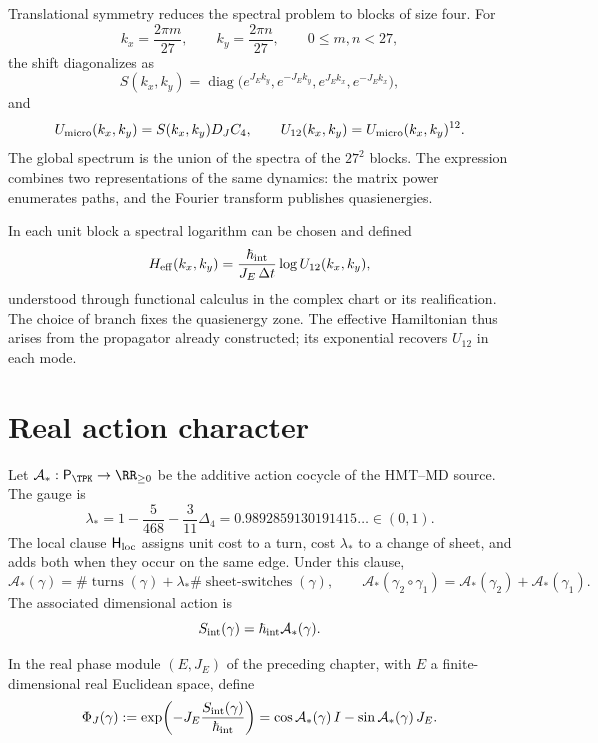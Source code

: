 Translational symmetry reduces the spectral problem to blocks of size
four. For
\[
 k_x=\frac{2\pi m}{27},\qquad
 k_y=\frac{2\pi n}{27},
 \qquad 0\le m,n<27,
\]
the shift diagonalizes as
\[
 S(k_x,k_y)=\operatorname{diag}
 \bigl(e^{J_Ek_y},e^{-J_Ek_y},e^{J_Ek_x},e^{-J_Ek_x}\bigr),
\]
and
\begin{equation}
 U_{\rm micro}(k_x,k_y)=S(k_x,k_y)D_JC_4,
 \qquad
 U_{12}(k_x,k_y)=U_{\rm micro}(k_x,k_y)^{12}.
 \label{eq:bloque-fourier-ledger-27}
\end{equation}
The global spectrum is the union of the spectra of the \(27^2\) blocks.
The expression combines two representations of the same dynamics: the matrix
power enumerates paths, and the Fourier transform publishes
quasienergies.

In each unit block a spectral logarithm can be chosen and defined
\[
 H_{\rm eff}(k_x,k_y)
 =\frac{\hbar_{\rm int}}{J_E\,\Delta t}
   \log U_{12}(k_x,k_y),
\]
understood through functional calculus in the complex chart or its realification.
The choice of branch fixes the quasienergy zone. The effective Hamiltonian
thus arises from the propagator already constructed; its exponential recovers
\(U_{12}\) in each mode.

\section{Real action character}

Let \(\mathcal A_*:\mathsf P_{\TPK}\to\RR_{\geq0}\) be the additive action cocycle of the
HMT--MD source. The gauge is
\[
 \lambda_*
 =1-\frac5{468}-\frac3{11}\Delta_4
 =0.9892859130191415\ldots\in(0,1).
\]
The local clause \(\mathsf H_{\rm loc}\) assigns unit cost to a turn,
cost \(\lambda_*\) to a change of sheet, and adds both when they occur on the
same edge. Under this clause,
\[
 \mathcal A_*(\gamma)
 =\#\operatorname{turns}(\gamma)
  +\lambda_*\#\operatorname{sheet\mbox{-}switches}(\gamma),
\qquad
 \mathcal A_*(\gamma_2\circ\gamma_1)
 =\mathcal A_*(\gamma_2)+\mathcal A_*(\gamma_1).
\]
The associated dimensional action is
\[
 S_{\rm int}(\gamma)=\hbar_{\rm int}\mathcal A_*(\gamma).
\]

In the real phase module \((E,J_E)\) of the preceding chapter, with \(E\) a
finite-dimensional real Euclidean space, define
\begin{equation}
 \Phi_J(\gamma)
 :=\exp\!\left(-J_E\frac{S_{\rm int}(\gamma)}{\hbar_{\rm int}}\right)
 =\cos\mathcal A_*(\gamma)\,I
  -\sin\mathcal A_*(\gamma)\,J_E.
 \label{eq:caracter-real-accion}
\end{equation}

